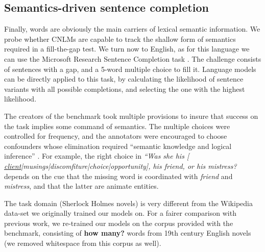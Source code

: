 \subsection{Semantics-driven sentence completion}
\label{sec:semantics}

Finally, words are obviously the main carriers of lexical semantic
information. We probe whether CNLMs are capable to track the shallow
form of semantics required in a fill-the-gap test. We turn now to English, as for this language we can use the Microsoft
Research Sentence Completion task \cite{Zweig:Burges:2011}. The
challenge consists of sentences with a gap, and a 5-word multiple
choice to fill it. Language models can be
directly applied to this task, by calculating the likelihood of sentence
variants with all possible completions, and selecting the one with the
highest likelihood.

The creators of the benchmark took multiple provisions to insure that
success on the task implies some command of semantics. The multiple
choices were controlled for frequency, and the annotators were
encouraged to choose confounders whose elimination required ``semantic
knowledge and logical inference'' \cite{Zweig:Burges:2011}.  For
example, the right choice in \emph{``Was she his [
  \underline{client}|musings|discomfiture|choice|opportunity], his
  friend, or his mistress?} depends on the cue that the missing word is
coordinated with \emph{friend} and \emph{mistress}, and that the
latter are animate entities.

The task domain (Sherlock Holmes novels) is very different
from the Wikipedia data-set we originally trained our models on. For a
fairer comparison with previous work, we re-trained our models on
the corpus provided with the benchmark, consisting of
\textbf{how many?} words from 19th century English novels (we removed
whitespace from this corpus as well).

